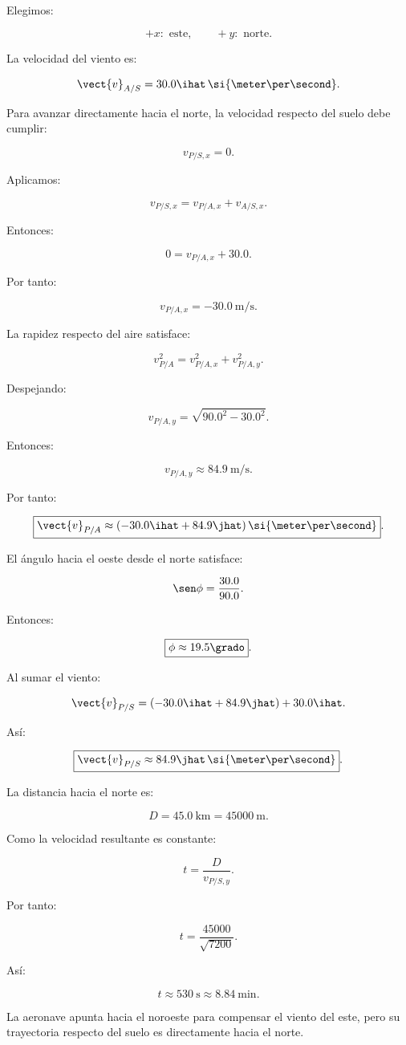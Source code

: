\begin{explicacion}
Elegimos:

\[
+x:\text{ este},
\qquad
+y:\text{ norte}.
\]

La velocidad del viento es:

\[
\vect{v}_{A/S}
=
30.0\ihat\,
\si{\meter\per\second}.
\]

Para avanzar directamente hacia el norte,
la velocidad respecto del suelo debe cumplir:

\[
v_{P/S,x}=0.
\]

Aplicamos:

\[
v_{P/S,x}
=
v_{P/A,x}+v_{A/S,x}.
\]

Entonces:

\[
0=v_{P/A,x}+30.0.
\]

Por tanto:

\[
\boxed{
v_{P/A,x}
=
-\SI{30.0}{\meter\per\second}
}.
\]

La rapidez respecto del aire satisface:

\[
v_{P/A}^2
=
v_{P/A,x}^2+v_{P/A,y}^2.
\]

Despejando:

\[
v_{P/A,y}
=
\sqrt{90.0^2-30.0^2}.
\]

Entonces:

\[
\boxed{
v_{P/A,y}
\approx
\SI{84.9}{\meter\per\second}
}.
\]

Por tanto:

\[
\boxed{
\vect{v}_{P/A}
\approx
(-30.0\ihat+84.9\jhat)\,
\si{\meter\per\second}
}.
\]

El ángulo hacia el oeste desde el norte
satisface:

\[
\sen\phi=\frac{30.0}{90.0}.
\]

Entonces:

\[
\boxed{
\phi\approx19.5\grado
}.
\]

Al sumar el viento:

\[
\vect{v}_{P/S}
=
(-30.0\ihat+84.9\jhat)
+
30.0\ihat.
\]

Así:

\[
\boxed{
\vect{v}_{P/S}
\approx
84.9\jhat\,
\si{\meter\per\second}
}.
\]

La distancia hacia el norte es:

\[
D=\SI{45.0}{\kilo\meter}
=
\SI{45000}{\meter}.
\]

Como la velocidad resultante es constante:

\[
t=\frac{D}{v_{P/S,y}}.
\]

Por tanto:

\[
t
=
\frac{45000}{\sqrt{7200}}.
\]

Así:

\[
\boxed{
t\approx\SI{530}{\second}
\approx\SI{8.84}{\minute}
}.
\]

La aeronave apunta hacia el noroeste
para compensar el viento del este,
pero su trayectoria respecto del suelo
es directamente hacia el norte.
\end{explicacion}


